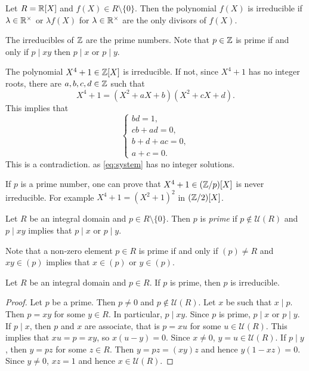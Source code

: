 \begin{example}
	Let $R=\mathbb{R}[X]$ and $f(X)\in R\setminus\{0\}$. Then the polynomial $f(X)$ is irreducible if 
	$\lambda\in\mathbb{R}^{\times}$ or $\lambda f(X)$ for $\lambda\in\mathbb{R}^{\times}$ 
	are the only divisors
	of $f(X)$.  
\end{example}

The irreducibles of $\mathbb{Z}$ are the prime numbers. Note that $p\in \mathbb{Z}$
is prime if and only if $p\mid xy$ then $p\mid x$ or $p\mid y$. 

\begin{example}
    The polynomial $X^4+1\in\mathbb{Z}[X]$ is irreducible. If not, 
    since $X^4+1$ has no integer roots, there are 
    $a,b,c,d\in\mathbb{Z}$ such that
    \[
    X^4+1=(X^2+aX+b)(X^2+cX+d).
    \]
    This implies that 
    \begin{equation}
    \label{eq:system}
    \begin{cases}
    bd=1,\\
    cb+ad=0,\\
    b+d+ac=0,\\
    a+c=0.
    \end{cases}
    \end{equation}
    This is a contradiction. as \eqref{eq:system} has no integer solutions.
\end{example}

If $p$ is a prime number, 
one can prove that $X^4+1\in(\mathbb{Z}/p)[X]$ is never irreducible. For example
$X^4+1=(X^2+1)^2$ in $(\mathbb{Z}/2)[X]$. 

\begin{definition}
	Let $R$ be an integral domain and $p\in R\setminus\{0\}$. Then  
	$p$ is \emph{prime} if $p\not\in\mathcal{U}(R)$ and 
	$p\mid xy$ implies that $p\mid x$ or $p\mid y$. 
\end{definition}

Note that a non-zero element $p\in R$ is prime 
if and only if $(p)\ne R$ and 
$xy\in (p)$ implies that $x\in (p)$ or $y\in (p)$. 

\begin{proposition}
	Let $R$ be an integral domain and $p\in R$. 
	If $p$ is prime, then $p$ is irreducible. 
\end{proposition}

\begin{proof}
	Let $p$ be a prime. Then $p\ne 0$ and $p\not\in\mathcal{U}(R)$. Let $x$ be such that
	$x\mid p$. Then $p=xy$ for some $y\in R$. In particular, $p\mid xy$. 
	Since $p$ is prime, $p\mid x$ or $p\mid y$. If $p\mid x$, then
	$p$ and $x$ are associate, that is $p=xu$ for some $u\in\mathcal{U}(R)$.
	This implies that $xu=p=xy$, so $x(u-y)=0$. Since $x\ne 0$, 
	$y=u\in\mathcal{U}(R)$. 
	If $p\mid y$, then $y=pz$ for some $z\in R$. Then
	$y=pz=(xy)z$ and hence $y(1-xz)=0$. Since $y\ne 0$, 
	$xz=1$ and hence $x\in\mathcal{U}(R)$. 
\end{proof}

